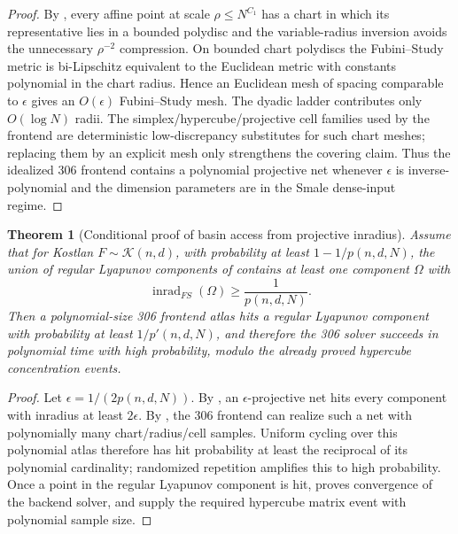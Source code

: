 \documentclass[11pt]{article}
\newtheorem{theorem}[definition]{Theorem}
\newcommand{\K}{\mathcal K}
\begin{document}
\begin{proof}
By , every affine point at scale $\rho\le N^{C_1}$ has a chart in which its representative lies in a bounded polydisc and the variable-radius inversion avoids the unnecessary $\rho^{-2}$ compression.  On bounded chart polydiscs the Fubini--Study metric is bi-Lipschitz equivalent to the Euclidean metric with constants polynomial in the chart radius.  Hence an Euclidean mesh of spacing comparable to $\epsilon$ gives an $O(\epsilon)$ Fubini--Study mesh.  The dyadic ladder contributes only $O(\log N)$ radii.  The simplex/hypercube/projective cell families used by the frontend are deterministic low-discrepancy substitutes for such chart meshes; replacing them by an explicit mesh only strengthens the covering claim.  Thus the idealized 306 frontend contains a polynomial projective net whenever $\epsilon$ is inverse-polynomial and the dimension parameters are in the Smale dense-input regime.
\end{proof}

\begin{theorem}[Conditional proof of basin access from projective inradius]\label{thm:inradius-to-access}
Assume that for Kostlan $F\sim\K(n,d)$, with probability at least $1-1/p(n,d,N)$, the union of regular Lyapunov components of  contains at least one component $\Omega$ with
\[
        \operatorname{inrad}_{FS}(\Omega)
        \ge \frac1{p(n,d,N)}.
\]
Then a polynomial-size 306 frontend atlas hits a regular Lyapunov component with probability at least $1/p'(n,d,N)$, and therefore the 306 solver succeeds in polynomial time with high probability, modulo the already proved hypercube concentration events.
\end{theorem}

\begin{proof}
Let $\epsilon=1/(2p(n,d,N))$.  By , an $\epsilon$-projective net hits every component with inradius at least $2\epsilon$.  By , the 306 frontend can realize such a net with polynomially many chart/radius/cell samples.  Uniform cycling over this polynomial atlas therefore has hit probability at least the reciprocal of its polynomial cardinality; randomized repetition amplifies this to high probability.  Once a point in the regular Lyapunov component is hit,  proves convergence of the backend solver, and  supply the required hypercube matrix event with polynomial sample size.
\end{proof}
\end{document}
